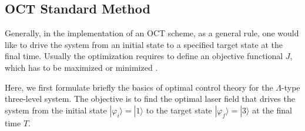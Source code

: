 \documentclass[]{interact}
\theoremstyle{plain}%
\theoremstyle{definition}
\theoremstyle{remark}
\begin{document}
\subsection{OCT Standard Method}
Generally, in the implementation of an OCT scheme, as a general rule, one 
would like to drive the system from an initial state to a specified target 
state 
at the final time. Usually the optimization 
requires to define an objective functional $J$, which  has to be 
maximized or minimized \cite{Rabitz,Vivie}. 

Here, we first formulate briefly the basics of optimal control theory for 
the $\Lambda$-type three-level system. The objective is to find the optimal 
laser field that drives the system from the initial state 
$|\varphi_i\rangle=|1\rangle$ to the target state $|\varphi_f\rangle=|3\rangle$ 
at the final time $T$. 
\end{document}
